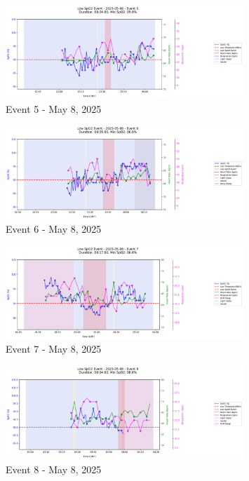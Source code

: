 \documentclass{article}
\begin{document}
\begin{figure}[htbp]
    \centering
    \includegraphics[width=0.8\textwidth]{images/2025-05-08_event_5.png}
    \caption{Event 5 - May 8, 2025}
\end{figure}
\begin{figure}[htbp]
    \centering
    \includegraphics[width=0.8\textwidth]{images/2025-05-08_event_6.png}
    \caption{Event 6 - May 8, 2025}
\end{figure}
\begin{figure}[htbp]
    \centering
    \includegraphics[width=0.8\textwidth]{images/2025-05-08_event_7.png}
    \caption{Event 7 - May 8, 2025}
\end{figure}
\begin{figure}[htbp]
    \centering
    \includegraphics[width=0.8\textwidth]{images/2025-05-08_event_8.png}
    \caption{Event 8 - May 8, 2025}
\end{figure}
\clearpage
\end{document}

